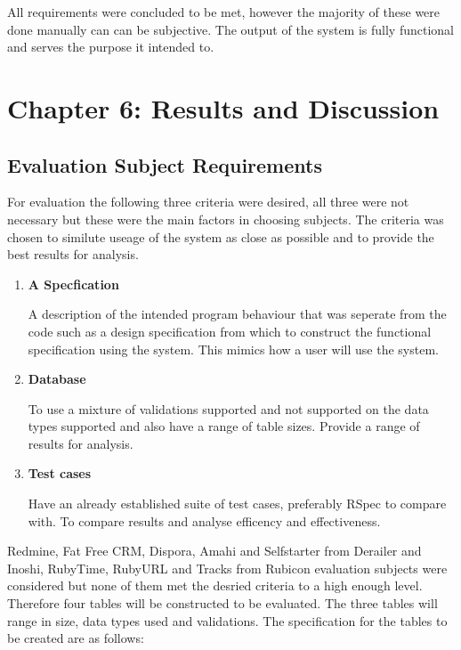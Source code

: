 \documentclass[a4paper,12pt]{article}
\begin{document}
\par All requirements were concluded to be met, however the majority of these were done manually can can be subjective. The output of the system is fully functional and serves the purpose it intended to.


\section{Chapter 6: Results and Discussion}

\subsection{Evaluation Subject Requirements}
\par For evaluation the following three criteria were desired, all three were not necessary but these were the main factors in choosing subjects. The criteria was chosen to similute useage of the system as close as possible and to provide the best results for analysis.
\begin{enumerate}
\item \textbf{A Specfication}
\par A description of the intended program behaviour that was seperate from the code such as a design specification from which to construct the functional specification using the system. This mimics how a user will use the system.
\item \textbf{Database}
\par To use a mixture of validations supported and not supported on the data types supported and also have a range of table sizes. Provide a range of results for analysis.
\item \textbf{Test cases}
\par Have an already established suite of test cases, preferably RSpec to compare with. To compare results and analyse efficency and effectiveness.
\end{enumerate}

\cite{near2012rubicon}
\cite{near2014derailer}
\par Redmine, Fat Free CRM, Dispora, Amahi and Selfstarter from Derailer\cite{near2014derailer} and Inoshi, RubyTime, RubyURL and Tracks from Rubicon\cite{near2012rubicon} evaluation subjects were considered but none of them met the desried criteria to a high enough level. Therefore four tables will be constructed to be evaluated. The three tables will range in size, data types used and validations. The specification for the tables to be created are as follows:
\end{document}
